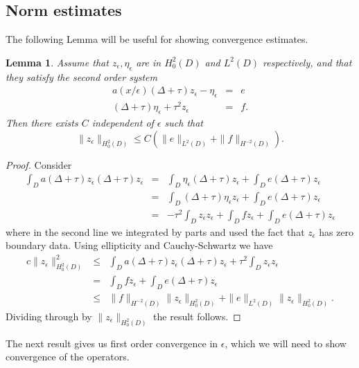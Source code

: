 \documentclass[12pt]{article}
\newtheorem{lemma}{Lemma}
\begin{document}
\subsection{Norm estimates}
The following Lemma will be useful for showing convergence estimates.
\begin{lemma} \label{systemlem} Assume that $z_\epsilon, \eta_\epsilon$ are in $H^2_0( D)$ and $L^2( D)$ respectively, and that they satisfy the second order system 
\begin{eqnarray}\label{eq:zepssystem}  a(x/\epsilon) (\Delta +\tau )z_\epsilon - \eta_\epsilon  &= & e \\ (\Delta +\tau )\eta_\epsilon  +\tau^2 z_\epsilon &=& f. \nonumber\end{eqnarray}
Then there exists $C$ independent of $\epsilon$ such that 
\begin{equation} \| z_\epsilon\|_{H^2_0( D)} \leq C (\| e \|_{L^2( D)} + \| f\|_{H^{-2}( D)}). \end{equation} 
\end{lemma}
\begin{proof}
Consider \begin{eqnarray} \int_ D a(\Delta + \tau)z_\epsilon (\Delta +\tau)z_\epsilon &=& \int_ D \eta_\epsilon (\Delta +\tau)z_\epsilon + \int_ D e(\Delta+\tau)z_\epsilon \nonumber \\ &=& \int_ D  (\Delta +\tau)\eta_\epsilon z_\epsilon + \int_ D e(\Delta+\tau)z_\epsilon \nonumber \\ 
&=&-\tau^2 \int_ D z_\epsilon z_\epsilon +\int_ D f z_\epsilon + \int_ D e(\Delta+\tau)z_\epsilon \nonumber \end{eqnarray}
where in the second line we integrated by parts and used the fact that $z_\epsilon$ has zero boundary data. Using ellipticity and Cauchy-Schwartz we have
 \begin{eqnarray} c\| z_\epsilon\|^2_{H^2_0( D)} &\leq& \int_ D a(\Delta + \tau)z_\epsilon (\Delta +\tau)z_\epsilon +\tau^2 \int_ D z_\epsilon z_\epsilon \nonumber \\ &= &\int_ D f z_\epsilon + \int_ D e(\Delta+\tau)z_\epsilon \nonumber \\ &\leq& \| f\|_{H^{-2}( D)} \| z_\epsilon\|_{H^2_0( D)} + \| e \|_{L^2( D)}   \| z_\epsilon\|_{H^2_0( D)} .\end{eqnarray}
Dividing through by $\| z_\epsilon\|_{H^2_0( D)}$ the result follows.
\end{proof}
\noindent
The next result gives us first order convergence in $\epsilon$, which we will need to show convergence of the operators. 
\end{document}
